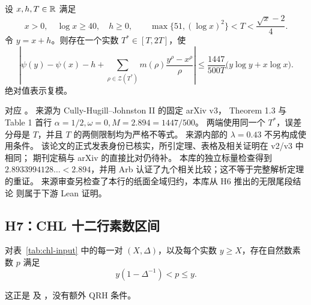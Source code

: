 \begin{definition}[H6：短区间显式公式]
\label{hyp:chj}
设 $x,h,T\in\mathbb R$ 满足
\[
x>0,\quad\log x\ge40,\quad h\ge0,\qquad
\max\{51,(\log x)^2\}<T<\frac{\sqrt{x}-2}{4}.
\]
令 $y=x+h$。则存在一个实数 $T^*\in[T,2T]$，使
\begin{equation}
\label{eq:chj-input}
\left|\psi(y)-\psi(x)-h+
\sum_{\rho\in\mathcal Z(T^*)}m(\rho)\frac{y^\rho-x^\rho}{\rho}\right|
\le\frac{1447}{500T}\bigl(y\log y+x\log x\bigr).
\end{equation}
绝对值表示复模。
\end{definition}
对应 。
来源为 Cully-Hugill--Johnston II \cite{CHJII} 的固定 arXiv v3，
Theorem 1.3 与 Table 1 首行
$\alpha=1/2,\omega=0,M=2.894=1447/500$。
两端使用同一个 $T^*$，误差分母是 $T$，并且 $T$ 的两侧限制均为严格不等式。
来源内部的 $\lambda=0.43$ 不另构成使用条件。
该论文的正式发表身份已核实，所引定理、表格及相关证明在 v2/v3 中相同；
期刊定稿与 arXiv 的直接比对仍待补。
本库的独立标量检查得到 $2.8933994128\ldots<2.894$，并用 Arb
认证了九个相关比较；这不等于完整解析定理的重证。
来源审查另检查了本行的纸面全域归约，本库从 H6 推出的无限尾段结论
则属于下游 Lean 证明。

\subsection{H7：CHL 十二行素数区间}

\begin{definition}
\label{hyp:chl}
对表~\ref{tab:chl-input} 中的每一对 $(X,\Delta)$，以及每个实数
$y\ge X$，存在自然数素数 $p$ 满足
\begin{equation}
\label{eq:chl-input}
y(1-\Delta^{-1})<p\le y.
\end{equation}
\end{definition}
这正是  及
，没有额外 QRH 条件。

